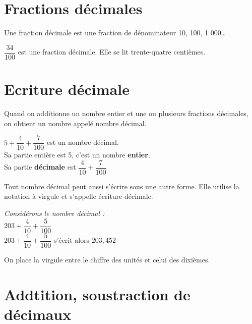 \documentclass[11pt]{article}
\begin{document}
\section{Fractions décimales}

\begin{definition}
  Une fraction décimale est une fraction de dénominateur 10, 100, 1
  000\ldots
\end{definition}

\begin{exemple}
  $\dfrac{34}{100}$ est une fraction décimale. Elle se lit
  trente-quatre centièmes.
\end{exemple}

\section{Ecriture décimale}

\begin{definition}
  Quand on additionne un nombre entier et une ou plusieurs fractions
  décimales, on obtient un nombre appelé nombre décimal.
\end{definition}

\begin{exemple}
  $5+\dfrac{4}{10}+\dfrac{7}{100}$ est un nombre décimal. \\
  Sa partie entière est 5, c'est un nombre \textbf{entier}. \\
  Sa partie \textbf{décimale} est $\dfrac{4}{10}+\dfrac{7}{100}$
\end{exemple}

\begin{definition}
  Tout nombre décimal peut aussi s’écrire sous une autre forme. Elle
  utilise la notation à virgule et s'appelle écriture décimale.
\end{definition}

\begin{exemple}
  \textit{Considérons le nombre décimal :} \\
  $203+\dfrac{4}{10}+\dfrac{5}{100}$ \\
  $203+\dfrac{4}{10}+\dfrac{5}{100}$ s'écrit alors $203{,}452$
\end{exemple}

\begin{remarque}
  On place la virgule entre le chiffre des unités et celui des
  dixièmes.
\end{remarque}

\section{Addtition, soustraction de décimaux}
\end{document}
